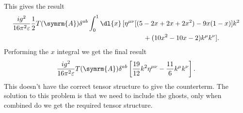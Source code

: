 \documentclass[fleqn]{NotesClass}
\newcommand{\minkowskiMetric}{\eta}
\newcommand{\adjointRep}{\symrm{A}}
\begin{document}
    This gives the result
    \begin{align}
        \frac{ig^2}{16\pi^2\varepsilon} \frac{1}{2}T(\adjointRep)\delta^{ab} \int_0^1 \dl{x} \, [ \minkowskiMetric^{\mu\nu}[&(5 - 2x + 2x + 2x^2) - 9x(1 - x)]k^2 \notag\\
        &\quad+ (10x^2 - 10x - 2)k^\mu k^\nu ].
    \end{align}
    Performing the \(x\) integral we get the final result
    \begin{equation}
        \frac{ig^2}{16\pi^2\varepsilon} T(\adjointRep)\delta^{ab}\left[ \frac{19}{12}k^2\minkowskiMetric^{\mu\nu} - \frac{11}{6} k^\mu k^\nu \right].
    \end{equation}
    This doesn't have the correct tensor structure to give the counterterm.
    The solution to this problem is that we need to include the ghosts, only when combined do we get the required tensor structure.
    
\end{document}
